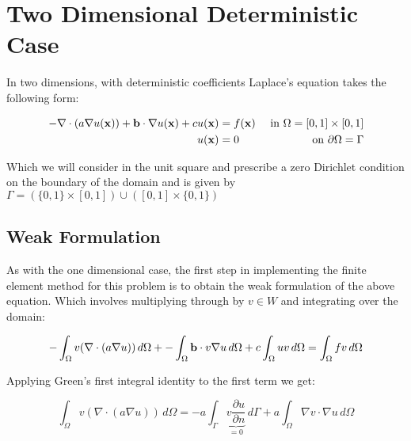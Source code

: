 \chapter{Two Dimensional Deterministic Case}


In two dimensions, with deterministic coefficients Laplace's equation takes the
following form:

\begin{equation}\label{eq:two-d-deterministic}
\begin{aligned}
    -\nabla\cdot(a\nabla u(\mathbf{x})) + \mathbf{b} \cdot \nabla u(\mathbf{x}) + c u(\mathbf{x}) &= f(\mathbf{x})
                               &\text{ in } \Omega = [0,1] \times [0,1] \\
    u(\mathbf{x}) &= 0 &\text{ on } \partial\Omega = \Gamma
\end{aligned}
\end{equation}

Which we will consider in the unit square and prescribe a zero Dirichlet
condition on the boundary of the domain and is given by
$\Gamma = (\{0,1\} \times [0,1]) \cup ([0,1] \times \{0,1\})$

\section{Weak Formulation}


As with the one dimensional case, the first step in implementing the finite
element method for this problem is to obtain the weak formulation of the above
equation. Which involves multiplying through by $v \in W$ and integrating over
the domain:

\begin{equation}
    -\int_{\Omega}{v(\nabla\cdot(a\nabla{u}))}\,d\Omega +
    -\int_{\Omega}\mathbf{b}\cdot v\nabla{u}\,d\Omega +
    c\int_{\Omega}uv\,d\Omega = \int_{\Omega}fv\,d\Omega
\end{equation}

Applying Green's first integral identity to the first term we get:

\begin{equation}
    \int_{\Omega}v(\nabla\cdot(a\nabla u))\, d\Omega =
    -a\int_{\Gamma}\underbrace{v\frac{\partial{u}}{\partial{n}}}_{ =0} \,d\Gamma
    + a\int_{\Omega}\nabla{v}\cdot\nabla{u}\,d\Omega
\end{equation}

